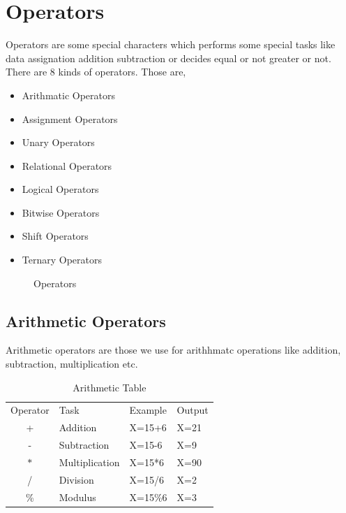 \documentclass[A4 paper,openany]{book}  %
\begin{document}
\chapter{Operators}
Operators\cite{Ref8} are some special characters which performs some special tasks like data assignation addition subtraction or decides equal or not greater or not.
There are 8 kinds of operators. Those are,
\begin{itemize}
    \item Arithmatic Operators
    \item Assignment Operators
    \item Unary Operators
    \item Relational Operators
    \item Logical Operators
    \item Bitwise Operators
    \item Shift Operators
    \item Ternary Operators
\end{itemize}
% 
%
\begin{figure}[htbp]
    \begin{center}
        \caption{Operators\cite{Ref8}}
    \end{center}
\end{figure}
% 
% 
\section{Arithmetic Operators}
Arithmetic operators\cite{Ref8} are those we use for arithhmatc operations like addition, subtraction, multiplication etc.
% 
% 
\begin{table}[htbp]
    \begin{tabular}{clll}
        \multicolumn{1}{l}{Operator} & Task           & Example & Output \\
        +                            & Addition       & X=15+6  & X=21   \\
        -                            & Subtraction    & X=15-6  & X=9    \\
        $*$                          & Multiplication & X=15*6  & X=90   \\
        /                            & Division       & X=15/6  & X=2    \\
        \%                           & Modulus        & X=15\%6 & X=3
    \end{tabular}
    \centering
    \caption{Arithmetic Table}
\end{table}
% 
% 
\end{document}
